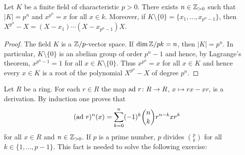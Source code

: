 


\begin{lemma}
	\label{lem:k_finito}
	Let $K$ be a finite field of characteristic $p>0$. There exists 
	$n\in\mathbb{Z}_{>0}$ such that $|K|=p^n$ and $x^{p^n}=x$ for all $x\in k$. Moreover, 
	if $K\setminus\{0\}=\{x_1,\dots,x_{p^n-1}\}$, then 
	$X^{p^n}-X=(X-x_1)\cdots(X-x_{p^n-1})X$. 
\end{lemma}

\begin{proof}
	The field $K$ is a $\mathbb{Z}/p$-vector space. If $\dim{\mathbb{Z}/p} k=n$, then 
	$|K|=p^n$. In particular, $K\setminus\{0\}$ is an abelian
	group of order $p^{n}-1$ and hence, by Lagrange's theorem, 
	$x^{p^n-1}=1$ for all $x\in K\setminus\{0\}$. Thus $x^{p^n}=x$ for all $x\in K$
	and hence every $x\in K$ is a root of the polynomial 
	$X^{p^n}-X$ of degree $p^n$. 
\end{proof}

Let $R$ be a ring. For each $r\in R$ the map $\operatorname{ad}\,r\colon
R\to R$, $x\mapsto rx-xr$, is a derivation. 
By induction one proves that 
\begin{equation}
	\label{eq:Leibniz}
	(\operatorname{ad}\,r)^n(x)=\sum_{k=0}^n(-1)^k\binom{n}{k}r^{n-k}xr^k
\end{equation}
for all $x\in R$ and $n\in\mathbb{Z}_{>0}$. If $p$ 
is a prime number, 
$p$ divides $\binom{p}{k}$ for all $k\in\{1,\dots,p-1\}$. This fact
is needed to solve the following exercise:

